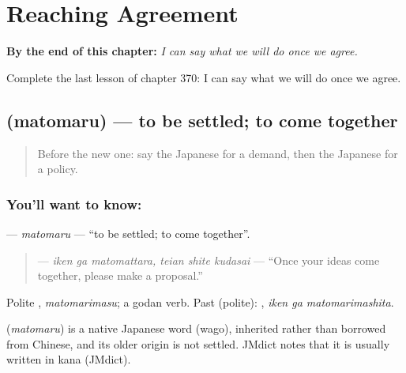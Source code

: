 
\chapter{Reaching Agreement}
\label{ch:ja-reaching-agreement}

\begin{chapteropening}
\textbf{By the end of this chapter:} \emph{I can say what we will do once we agree.}

Complete the last lesson of chapter 370: I can say what we will do once we agree.
\end{chapteropening}

\section[\texorpdfstring{\ja{まとまる} (matomaru)}{まとまる (matomaru)}]{ (matomaru) — to be settled; to come together}

\label{lesson:JA-C370-matomaru}



\begin{quote}
Before the new one: say the Japanese for a demand, then the Japanese for a policy.
\end{quote}

\subsection*{You'll want to know: }
\textbf{} — \emph{matomaru} — \textquotedblleft{}to be settled; to come together\textquotedblright{}.

\begin{quote}
\textbf{  } — \emph{iken ga matomattara, teian shite kudasai} — \textquotedblleft{}Once your ideas come together, please make a proposal.\textquotedblright{}
\end{quote}

Polite \textbf{}, \emph{matomarimasu}; a godan verb. Past (polite): \textbf{ }, \emph{iken ga matomarimashita}.

\begin{cousinweb}
\textbf{} (\emph{matomaru}) is a native Japanese word (wago), inherited rather than borrowed from Chinese, and its older origin is not settled. JMdict notes that it is usually written in kana (JMdict).
\end{cousinweb}

